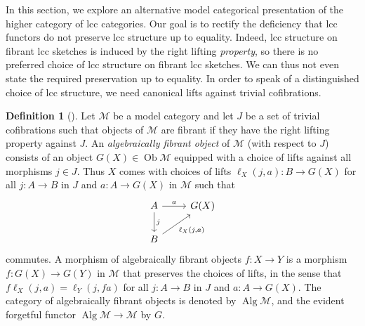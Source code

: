 \documentclass[a4paper]{article}
\theoremstyle{remark}
\theoremstyle{definition}
\newtheorem{definition}[theorem]{Definition}
\begin{document}
In this section, we explore an alternative model categorical presentation of the higher category of lcc categories.
Our goal is to rectify the deficiency that lcc functors do not preserve lcc structure up to equality.
Indeed, lcc structure on fibrant lcc sketches is induced by the right lifting \emph{property}, so there is no preferred choice of lcc structure on fibrant lcc sketches. 
We can thus not even state the required preservation up to equality.
In order to speak of a distinguished choice of lcc structure, we need canonical lifts against trivial cofibrations.

\begin{definition}[\cite{algebraic-models}]
  \label{def:algebraically-fibrant-objects}
  Let $\mathcal{M}$ be a model category and let $J$ be a set of trivial cofibrations such that objects of $\mathcal{M}$ are fibrant if they have the right lifting property against $J$.
  An \emph{algebraically fibrant object} of $\mathcal{M}$ (with respect to $J$) consists of an object $G(X) \in \operatorname{Ob} \mathcal{M}$ equipped with a choice of lifts against all morphisms $j \in J$.
  Thus $X$ comes with choices of lifts $\ell_X({j, a}) : B \rightarrow G(X)$ for all $j : A \rightarrow B$ in $J$ and $a : A \rightarrow G(X)$ in $\mathcal{M}$ such that
  \begin{equation}
    \begin{tikzcd}
      A \arrow[d, "j"] \arrow[r, "a"] & G(X) \\
      B \arrow[ur, "{\ell_X(j, a)}"']
    \end{tikzcd}
  \end{equation}
  commutes.
  A morphism of algebraically fibrant objects $f : X \rightarrow Y$ is a morphism $f : G(X) \rightarrow G(Y)$ in $\mathcal{M}$ that preserves the choices of lifts, in the sense that $f \ell_X(j, a) = \ell_Y(j, fa)$ for all $j : A \rightarrow B$ in $J$ and $a : A \rightarrow G(X)$.
  The category of algebraically fibrant objects is denoted by $\operatorname{Alg} \mathcal{M}$, and the evident forgetful functor $\operatorname{Alg} \mathcal{M} \rightarrow \mathcal{M}$ by $G$.
\end{definition}
\end{document}
